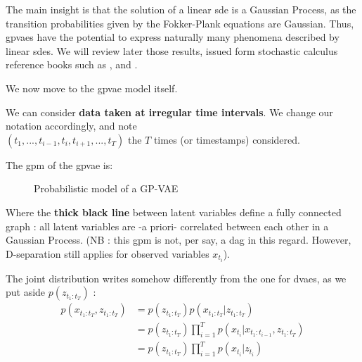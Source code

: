 The main insight is that the solution of a linear \gls{sde} is a Gaussian Process, as the transition probabilities given by the Fokker-Plank equations are Gaussian.
Thus, \glspl{gpvae} have the potential to express naturally many phenomena described by linear \glspl{sde}. 
We will review later those results, issued form stochastic calculus reference books such as \cite{mouvement-brownien-calcul-ito}, \cite{sarkka_applied_2019} and \cite{cours-jf-legall}. 

We now move to the \gls{gpvae} model itself.

We can consider \textbf{data taken at irregular time intervals}. We change our notation accordingly, and note \\
$(t_1, ..., t_{i-1}, t_i, t_{i+1}, ..., t_T)$ the $T$ times (or timestamps) considered. 

The \gls{gpm} of the \gls{gpvae} is:

\begin{figure}[H]
    \centering
    \label{fig:graphical_model_gpvae}
\caption{Probabilistic model of a GP-VAE}
\end{figure}

Where the \textbf{thick black line} between latent variables define a fully connected graph : all latent variables are -a priori- correlated between each other in a Gaussian Process. (NB : this \gls{gpm} is not, per say, a \gls{dag} in this regard. However, D-separation still applies for observed variables $x_{t_i}$).

The joint distribution writes somehow differently from the one for \glspl{dvae}, as we put aside $p(z_{t_1:t_T})$ :
\begin{align}
\label{joint_gpvae}
    p(x_{t_1:t_T}, z_{t_1:t_T}) &= p(z_{t_1:t_T}) p(x_{t_1:t_T} \vert z_{t_1:t_T}) \\
    &= p(z_{t_1:t_T}) \prod_{i=1}^T p(x_{t_i} \vert x_{t_1:t_{i-1}}, z_{t_1:t_T}) \\
    &= p(z_{t_1:t_T}) \prod_{i=1}^T p(x_{t_i} \vert z_{t_{i}})
\end{align}

